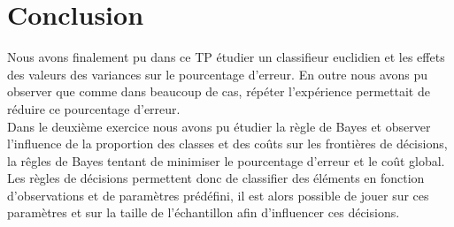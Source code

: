 \documentclass[a4paper, 8pt]{article}
\begin{document}
\newpage
\section*{Conclusion}
Nous avons finalement pu dans ce TP étudier un classifieur euclidien et les effets des valeurs des variances sur le pourcentage d’erreur.
En outre nous avons pu observer que comme dans beaucoup de cas, répéter l’expérience permettait de réduire ce pourcentage d’erreur.\\
Dans le deuxième exercice nous avons pu étudier la règle de Bayes et observer l’influence de la proportion des classes et des coûts sur les frontières de décisions, la rêgles de Bayes tentant de minimiser le pourcentage d’erreur et le coût  global.\\
Les règles de décisions permettent donc de classifier des éléments en fonction d’observations et de paramètres prédéfini, il est alors possible de jouer sur ces paramètres et sur la taille de l’échantillon afin d’influencer ces décisions.
\end{document}
